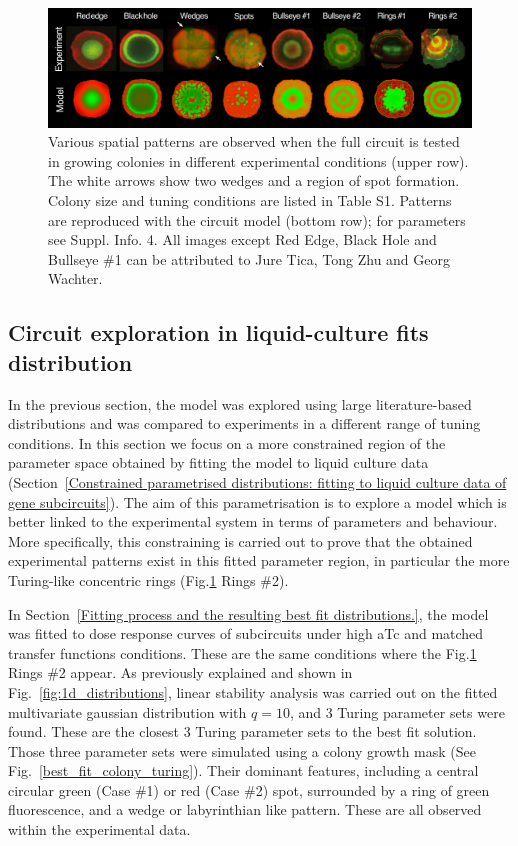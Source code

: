 \begin{figure}[H]
    \centering

    \includegraphics[width=1\textwidth]{chapters/Chapter 3/comparison_colonies_model_vs_experiment}
    \caption{Various spatial patterns are observed when the full circuit is tested in growing colonies in different experimental conditions (upper row). The white arrows show two wedges and a region of spot formation. Colony size and tuning conditions are listed in Table S1. Patterns are reproduced with the circuit model (bottom row); for parameters see Suppl. Info. 4. All images except Red Edge, Black Hole and Bullseye \#1 can be attributed to Jure Tica, Tong Zhu and Georg Wachter. }
    \label{comparison_colonies_model_vs_experiment}
\end{figure} %


\subsection{Circuit exploration in liquid-culture fits distribution}
In the previous section, the model was explored using large literature-based distributions and was compared to experiments in a different range of tuning conditions.
In this section we focus on a more constrained region of the parameter space obtained by fitting the model to liquid culture data (Section~\ref{Constrained parametrised distributions: fitting to liquid culture data of gene subcircuits}).
The aim of this parametrisation is to explore a model which is better linked to the experimental system in terms of parameters and behaviour.
More specifically, this constraining is carried out to prove that the obtained experimental patterns exist in this fitted parameter region, in particular the more Turing-like concentric rings (Fig.\ref{comparison_colonies_model_vs_experiment} Rings \#2).


In Section~\ref{Fitting process and the resulting best fit distributions.}, the model was fitted to dose response curves of subcircuits under high aTc and matched transfer functions conditions.
These are the same conditions where the Fig.\ref{comparison_colonies_model_vs_experiment} Rings \#2 appear.
As previously explained and shown in Fig.~\ref{fig:1d_distributions}, linear stability analysis was carried out on the fitted multivariate gaussian distribution with $q=10$, and 3 Turing parameter sets were found.
These are the closest 3 Turing parameter sets to the best fit solution.
Those three parameter sets were simulated using a colony growth mask (See Fig.~\ref{best_fit_colony_turing}). %
Their dominant features, including a central circular green (Case \#1) or red (Case \#2) spot, surrounded by a ring of green fluorescence, and a wedge or labyrinthian like pattern.
These are all observed within the experimental data. %

